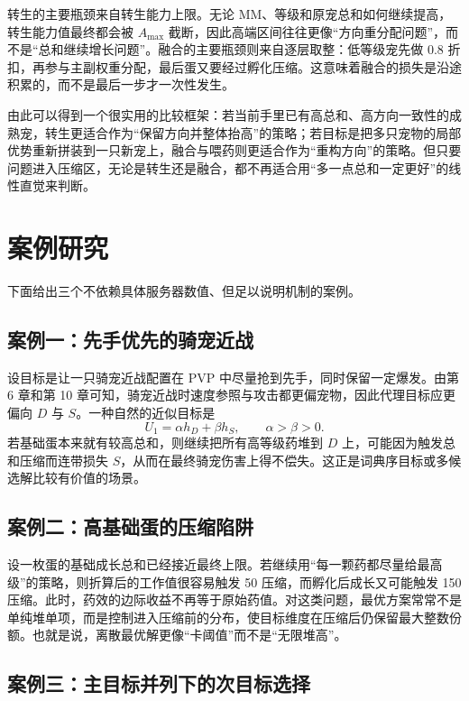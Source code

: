 转生的主要瓶颈来自转生能力上限。无论 MM、等级和原宠总和如何继续提高，转生能力值最终都会被 $A_{\max}$ 截断，因此高端区间往往更像“方向重分配问题”，而不是“总和继续增长问题”。融合的主要瓶颈则来自逐层取整：低等级宠先做 $0.8$ 折扣，再参与主副权重分配，最后蛋又要经过孵化压缩。这意味着融合的损失是沿途积累的，而不是最后一步才一次性发生。

由此可以得到一个很实用的比较框架：若当前手里已有高总和、高方向一致性的成熟宠，转生更适合作为“保留方向并整体抬高”的策略；若目标是把多只宠物的局部优势重新拼装到一只新宠上，融合与喂药则更适合作为“重构方向”的策略。但只要问题进入压缩区，无论是转生还是融合，都不再适合用“多一点总和一定更好”的线性直觉来判断。

\section{案例研究}

下面给出三个不依赖具体服务器数值、但足以说明机制的案例。

\subsection{案例一：先手优先的骑宠近战}

设目标是让一只骑宠近战配置在 PVP 中尽量抢到先手，同时保留一定爆发。由第 6 章和第 10 章可知，骑宠近战时速度参照与攻击都更偏宠物，因此代理目标应更偏向 $D$ 与 $S$。一种自然的近似目标是
\begin{equation}
    U_1 = \alpha h_D + \beta h_S,
    \qquad \alpha > \beta > 0.
\end{equation}
若基础蛋本来就有较高总和，则继续把所有高等级药堆到 $D$ 上，可能因为触发总和压缩而连带损失 $S$，从而在最终骑宠伤害上得不偿失。这正是词典序目标或多候选解比较有价值的场景。

\subsection{案例二：高基础蛋的压缩陷阱}

设一枚蛋的基础成长总和已经接近最终上限。若继续用“每一颗药都尽量给最高级”的策略，则折算后的工作值很容易触发 50 压缩，而孵化后成长又可能触发 150 压缩。此时，药效的边际收益不再等于原始药值。对这类问题，最优方案常常不是单纯堆单项，而是控制进入压缩前的分布，使目标维度在压缩后仍保留最大整数份额。也就是说，离散最优解更像“卡阈值”而不是“无限堆高”。

\subsection{案例三：主目标并列下的次目标选择}

